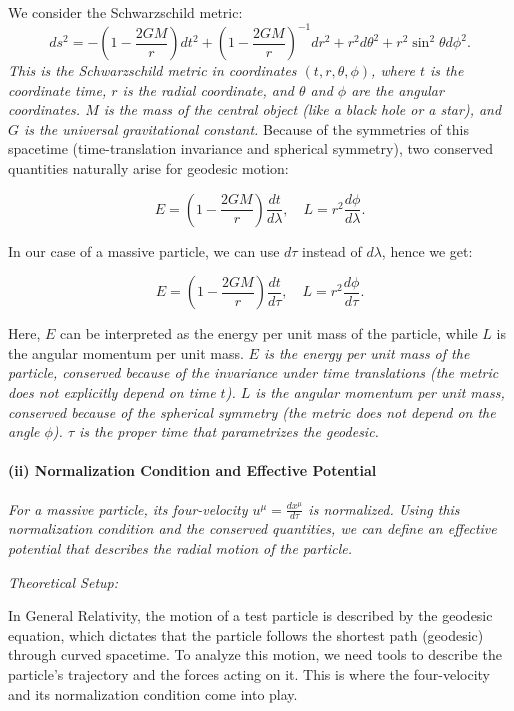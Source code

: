 We consider the Schwarzschild metric:
\begin{equation}
ds^2 = - \left(1 - \frac{2GM}{r}\right)dt^2 + \left(1 - \frac{2GM}{r}\right)^{-1}dr^2 + r^2 d\theta^2 + r^2 \sin^2\theta d\phi^2.
\end{equation}
\textit{This is the Schwarzschild metric in coordinates \((t, r, \theta, \phi)\), where \(t\) is the coordinate time, \(r\) is the radial coordinate, and \(\theta\) and \(\phi\) are the angular coordinates. \(M\) is the mass of the central object (like a black hole or a star), and \(G\) is the universal gravitational constant.}
Because of the symmetries of this spacetime (time-translation invariance and spherical symmetry), two conserved quantities naturally arise for geodesic motion:

\begin{equation}
E = \left(1 - \frac{2GM}{r}\right) \frac{dt}{d\lambda},
\quad
L = r^{2} \frac{d\phi}{d\lambda}.
\end{equation}

In our case of a massive particle, we can use $d\tau$ instead of $d\lambda$, hence we get:

\begin{equation}
E = \left(1 - \frac{2GM}{r}\right) \frac{dt}{d\tau},
\quad
L = r^{2} \frac{d\phi}{d\tau}.
\end{equation}

Here, \(E\) can be interpreted as the energy per unit mass of the particle, while \(L\) is the angular momentum per unit mass.
\textit{\(E\) is the energy per unit mass of the particle, conserved because of the invariance under time translations (the metric does not explicitly depend on time \(t\)). \(L\) is the angular momentum per unit mass, conserved because of the spherical symmetry (the metric does not depend on the angle \(\phi\)). \(\tau\) is the proper time that parametrizes the geodesic.}

\paragraph{(ii) Normalization Condition and Effective Potential}
\textit{For a massive particle, its four-velocity \(u^\mu = \frac{dx^\mu}{d\tau}\) is normalized. Using this normalization condition and the conserved quantities, we can define an effective potential that describes the radial motion of the particle.}

\textit{Theoretical Setup:}

In General Relativity, the motion of a test particle is described by the geodesic equation, which dictates that the particle follows the shortest path (geodesic) through curved spacetime. To analyze this motion, we need tools to describe the particle's trajectory and the forces acting on it. This is where the four-velocity and its normalization condition come into play.

